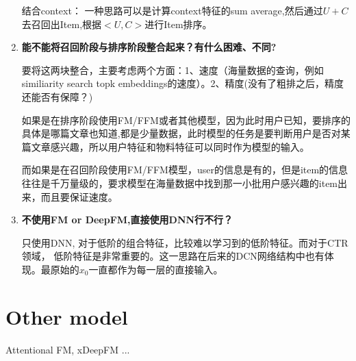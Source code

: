 \documentclass{article}
\begin{document}
\begin{CJK*}{UTF8}{gbsn}
\begin{enumerate}
结合context： 一种思路可以是计算context特征的sum average,然后通过$U+C$去召回出Item,根据$<U,C>$进行Item排序。
\item \textbf{能不能将召回阶段与排序阶段整合起来？有什么困难、不同?}

要将这两块整合，主要考虑两个方面：1、速度（海量数据的查询，例如 similiarity search topk embeddings的速度）。2、精度(没有了粗排之后，精度还能否有保障？)

如果是在排序阶段使用FM/FFM或者其他模型，因为此时用户已知，要排序的具体是哪篇文章也知道,都是少量数据，此时模型的任务是要判断用户是否对某篇文章感兴趣，所以用户特征和物料特征可以同时作为模型的输入。

而如果是在召回阶段使用FM/FFM模型，user的信息是有的，但是item的信息往往是千万量级的，要求模型在海量数据中找到那一小批用户感兴趣的item出来，而且要保证速度。

\item \textbf{不使用FM or DeepFM,直接使用DNN行不行？}

只使用DNN, 对于低阶的组合特征，比较难以学习到的低阶特征。而对于CTR领域， 低阶特征是非常重要的。这一思路在后来的DCN网络结构中也有体现。最原始的$x_{0}$一直都作为每一层的直接输入。
\end{enumerate}

\section{Other model}
Attentional FM, xDeepFM ...



\end{CJK*}
\end{document}
